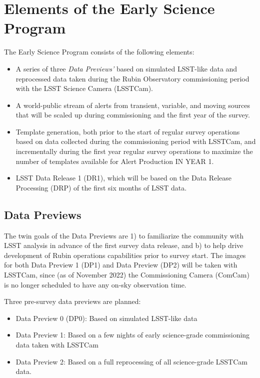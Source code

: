 \section{Elements of the Early Science Program}

The Early Science Program consists of the following elements:
\begin{itemize}
	\item A series of three \emph{Data Previews'} based on simulated LSST-like data and reprocessed data taken during the Rubin Observatory commissioning period with the LSST Science Camera (LSSTCam). 
	\item A world-public stream of alerts from transient, variable, and moving sources that will be scaled up during commissioning and the first year of the survey. 
	\item Template generation, both prior to the start of regular survey operations based on data collected during the commissioning period with LSSTCam, and incrementally during the first year regular survey operations  to maximize the number of templates available for Alert Production IN YEAR 1. 
	\item LSST Data Release 1 (DR1), which will be based on the Data Release Processing (DRP) of the first six months of LSST data.
\end{itemize}

\subsection{Data Previews}

The twin goals of the Data Previews are 1) to familiarize the community with LSST analysis in advance of the first survey data release, and b) to help drive development of Rubin operations capabilities prior to survey start.
The images for both Data Preview 1 (DP1) and Data Preview (DP2) will be taken with LSSTCam, since (as of November 2022) the Commissioning Camera (ComCam) is no longer scheduled to have any on-sky observation time.
	
Three pre-survey data previews are planned:
\begin{itemize}
\item  Data Preview 0 (DP0): Based on simulated LSST-like data
\item  Data Preview 1: Based on a few nights of early science-grade commissioning data taken with LSSTCam 
\item Data Preview 2: Based on a full reprocessing of all science-grade LSSTCam data.

\end{itemize}

